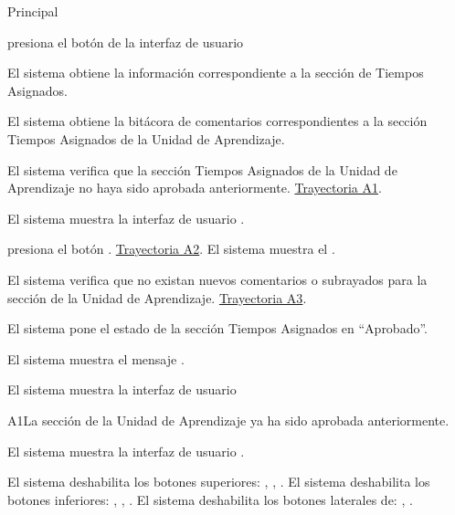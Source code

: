 \begin{UCtrayectoria}{Principal}

    \UCpaso[\UCactor] presiona el botón   de la interfaz de usuario 

    \UCpaso El sistema obtiene la información correspondiente a la sección de Tiempos Asignados.
    
    \UCpaso El sistema obtiene la bitácora de comentarios correspondientes a la sección Tiempos Asignados de la Unidad de Aprendizaje. 
    
    \UCpaso El sistema verifica que la sección Tiempos Asignados de la Unidad de Aprendizaje no haya sido aprobada anteriormente.  \hyperlink{SP2-CU8-A1}{Trayectoria A1}. 
    
    \UCpaso El sistema muestra la interfaz de usuario  .
    
    \UCpaso[\UCactor] presiona el botón . \hyperlink{SP2-CU8-A2}{Trayectoria A2}.
    \UCpaso El sistema muestra el .
    
    \UCpaso	El sistema verifica que no existan nuevos comentarios o subrayados para la sección de la Unidad de Aprendizaje. \hyperlink{SP2-CU8-A3}{Trayectoria A3}. 
    
    \UCpaso El sistema pone el estado de la sección Tiempos Asignados  en “Aprobado”.
    
    \UCpaso El sistema muestra el mensaje .

    \UCpaso El sistema muestra la interfaz de usuario 

\end{UCtrayectoria}


\begin{UCtrayectoriaA}{A1}{La sección de la Unidad de Aprendizaje ya ha sido aprobada anteriormente.}

	\hypertarget{SP2-CU8-A1}{\UCpaso El sistema muestra la interfaz de usuario .}
    \UCpaso El sistema deshabilita los botones superiores: , , .
    \UCpaso El sistema deshabilita los botones inferiores: , , .
    \UCpaso El sistema deshabilita los botones laterales de: , .
\end{UCtrayectoriaA}


